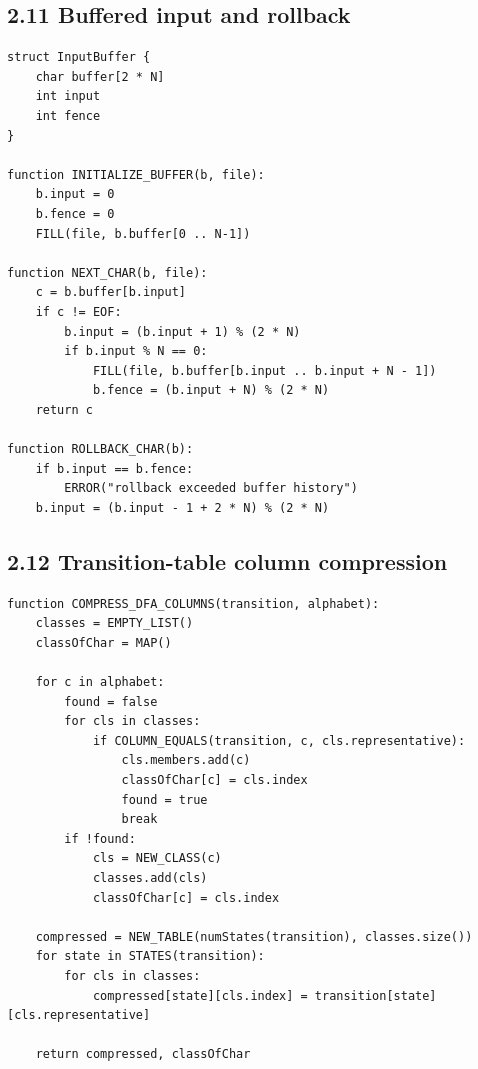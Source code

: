 \documentclass[10pt,letterpaper]{article}
\begin{document}
\subsection*{2.11 Buffered input and rollback}

\begin{verbatim}
struct InputBuffer {
    char buffer[2 * N]
    int input
    int fence
}

function INITIALIZE_BUFFER(b, file):
    b.input = 0
    b.fence = 0
    FILL(file, b.buffer[0 .. N-1])

function NEXT_CHAR(b, file):
    c = b.buffer[b.input]
    if c != EOF:
        b.input = (b.input + 1) % (2 * N)
        if b.input % N == 0:
            FILL(file, b.buffer[b.input .. b.input + N - 1])
            b.fence = (b.input + N) % (2 * N)
    return c

function ROLLBACK_CHAR(b):
    if b.input == b.fence:
        ERROR("rollback exceeded buffer history")
    b.input = (b.input - 1 + 2 * N) % (2 * N)
\end{verbatim}

\subsection*{2.12 Transition-table column compression}

\begin{verbatim}
function COMPRESS_DFA_COLUMNS(transition, alphabet):
    classes = EMPTY_LIST()
    classOfChar = MAP()

    for c in alphabet:
        found = false
        for cls in classes:
            if COLUMN_EQUALS(transition, c, cls.representative):
                cls.members.add(c)
                classOfChar[c] = cls.index
                found = true
                break
        if !found:
            cls = NEW_CLASS(c)
            classes.add(cls)
            classOfChar[c] = cls.index

    compressed = NEW_TABLE(numStates(transition), classes.size())
    for state in STATES(transition):
        for cls in classes:
            compressed[state][cls.index] = transition[state][cls.representative]

    return compressed, classOfChar
\end{verbatim}

\end{document}
